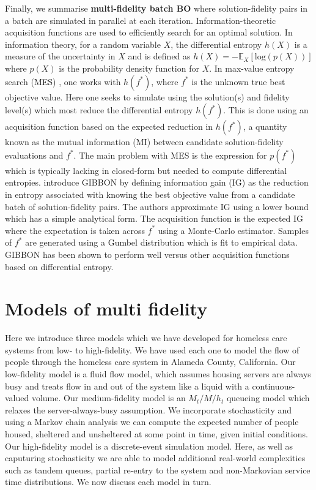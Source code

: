 \documentclass[12pt,a4paper]{article}
\begin{document}
Finally, we summarise \textbf{multi-fidelity batch BO} where solution-fidelity pairs in a batch are simulated in parallel at each iteration. Information-theoretic acquisition functions are used to efficiently search for an optimal solution. In information theory, for a random variable $X$, the differential entropy $h(X)$ is a measure of the uncertainty in $X$ and is defined as $h(X) = -\mathbb{E}_{X}[\text{log}(p(X))]$ where $p(X)$ is the probability density function for $X$. In max-value entropy search (MES) \citep{wang2017max}, one works with $h(f^{*})$, where $f^{*}$ is the unknown true best objective value. Here one seeks to simulate using the solution(s) and fidelity level(s) which most reduce the differential entropy  $h(f^{*})$. This is done using an acquisition function based on the expected reduction in $h(f^{*})$, a quantity known as the mutual information (MI) between candidate solution-fidelity evaluations and $f^{*}$. The main problem with MES is the expression for $p(f^{*})$ which is typically lacking in closed-form but needed to compute differential entropies. \cite{moss2021gibbon} introduce GIBBON by defining information gain (IG) as the reduction in entropy associated with knowing the best objective value from a candidate batch of solution-fidelity pairs. The authors approximate IG using a lower bound which has a simple analytical form. The acquisition function is the expected IG where the expectation is taken across $f^{*}$ using a Monte-Carlo estimator. Samples of $f^{*}$ are generated using a Gumbel distribution which is fit to empirical data. GIBBON has been shown to perform well versus other acquisition functions based on differential entropy. 

\newpage

\section{Models of multi fidelity} \label{models}
%
Here we introduce three models which we have developed for homeless care systems from low- to high-fidelity. We have used each one to model the flow of people through the homeless care system in Alameda County, California. Our low-fidelity model is a fluid flow model, which assumes housing servers are always busy and treats flow in and out of the system like a liquid with a continuous-valued volume. Our medium-fidelity model is an $M_t/M/h_t$ queueing model which relaxes the server-always-busy assumption. We incorporate stochasticity and using a Markov chain analysis we can compute the expected number of people housed, sheltered and unsheltered at some point in time, given initial conditions. Our high-fidelity model is a discrete-event simulation model. Here, as well as caputuring stochasticity we are able to model additional real-world complexities such as tandem queues, partial re-entry to the system and non-Markovian service time distributions. We now discuss each model in turn.
%
\end{document}
